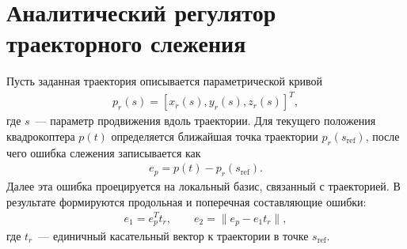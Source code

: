 \section{Аналитический регулятор траекторного слежения}


Пусть заданная траектория описывается параметрической кривой
\begin{gather}
    p_r(s) = [x_r(s), y_r(s), z_r(s)]^T,
\end{gather}
где $s$~--- параметр продвижения вдоль траектории. Для текущего положения
квадрокоптера $p(t)$ определяется ближайшая точка траектории
$p_r(s_{\mathrm{ref}})$, после чего ошибка слежения записывается как
\begin{gather}
    e_p = p(t) - p_r(s_{\mathrm{ref}}).
\end{gather}
Далее эта ошибка проецируется на локальный базис, связанный с траекторией.
В результате формируются продольная и поперечная составляющие ошибки:
\begin{gather}
    e_1 = e_p^T t_r, \qquad
    e_2 = \|e_p - e_1 t_r\|,
\end{gather}
где $t_r$~--- единичный касательный вектор к траектории в точке
$s_{\mathrm{ref}}$.

